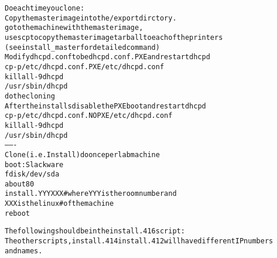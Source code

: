 \begin{alltt}
 Do each time you clone:
  Copy the master image into the /export dirctory.
   go to the machine with the master image,
   use scp to copy the master image tarball to each of the printers
    (see install_master for detailed command)
  Modify dhcpd.conf to be dhcpd.conf.PXE and restart dhcpd
   cp -p /etc/dhcpd.conf.PXE /etc/dhcpd.conf
   killall -9 dhcpd
   /usr/sbin/dhcpd
  do the cloning
  After the installs disable the PXE boot and restart dhcpd
   cp -p /etc/dhcpd.conf.NOPXE /etc/dhcpd.conf
   killall -9 dhcpd
   /usr/sbin/dhcpd
-------
Clone (i.e. Install) do once per lab machine
boot: Slackware
fdisk /dev/sda
 about 80% sda1 linux(83), 20% sda2 swap(82)
install.YYY XXX  #where YYY is the room number and 
  XXX is the linux # of the machine
reboot

The following should be in the install.416 script:
The other scripts, install.414 install.412  will have different IP numbers
and names.


\end{alltt}
